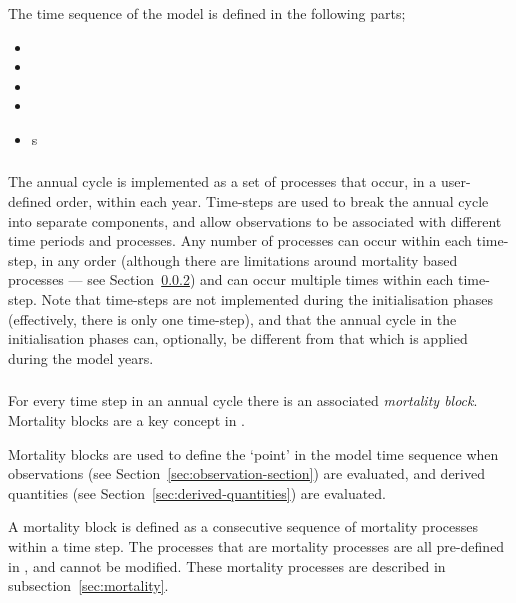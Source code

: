 The time sequence of the model is defined in the following parts;
\begin{itemize}
  \item {}
  \item {}
  \item {}
  \item {}
  \item {}s
\end{itemize}

\subsubsection{}

The annual cycle is implemented as a set of processes that occur, in a user-defined order, within each year. Time-steps are used to break the annual cycle into separate components, and allow observations to be associated with different time periods and processes. Any number of processes can occur within each time-step, in any order (although there are limitations around mortality based processes --- see Section~\ref{sec:mortality_block}) and can occur multiple times within each time-step. Note that time-steps are not implemented during the initialisation phases (effectively, there is only one time-step), and that the annual cycle in the initialisation phases can, optionally, be different from that which is applied during the model years.

\subsubsection{}\label{sec:mortality_block}

For every time step in an annual cycle there is an associated \emph{mortality block}. Mortality blocks are a key concept in \CNAME.

Mortality blocks are used to define the `point' in the model time sequence when observations (see Section~\ref{sec:observation-section}) are evaluated, and derived quantities (see Section~\ref{sec:derived-quantities}) are evaluated.

A mortality block is defined as a consecutive sequence of mortality processes within a time step. The processes that are mortality processes are all pre-defined in \CNAME, and cannot be modified. These mortality processes are described in subsection~\ref{sec:mortality}. 

